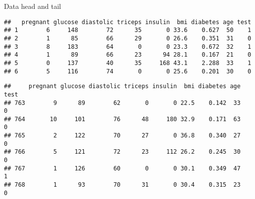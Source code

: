 \begin{frame}[fragile]{Data head and tail}
\protect\hypertarget{data-head-and-tail}{}

\begin{Shaded}
\begin{Highlighting}[]
\end{Highlighting}
\end{Shaded}

\begin{verbatim}
##   pregnant glucose diastolic triceps insulin  bmi diabetes age test
## 1        6     148        72      35       0 33.6    0.627  50    1
## 2        1      85        66      29       0 26.6    0.351  31    0
## 3        8     183        64       0       0 23.3    0.672  32    1
## 4        1      89        66      23      94 28.1    0.167  21    0
## 5        0     137        40      35     168 43.1    2.288  33    1
## 6        5     116        74       0       0 25.6    0.201  30    0
\end{verbatim}

\begin{Shaded}
\begin{Highlighting}[]
\end{Highlighting}
\end{Shaded}

\begin{verbatim}
##     pregnant glucose diastolic triceps insulin  bmi diabetes age test
## 763        9      89        62       0       0 22.5    0.142  33    0
## 764       10     101        76      48     180 32.9    0.171  63    0
## 765        2     122        70      27       0 36.8    0.340  27    0
## 766        5     121        72      23     112 26.2    0.245  30    0
## 767        1     126        60       0       0 30.1    0.349  47    1
## 768        1      93        70      31       0 30.4    0.315  23    0
\end{verbatim}

\end{frame}

